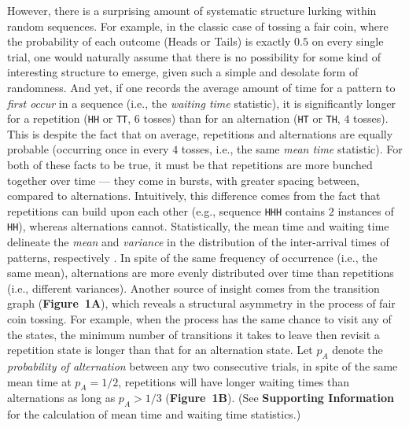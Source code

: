 \documentclass{pnastwo}
\begin{document}
\begin{article}
However, there is a surprising amount of systematic structure lurking within random sequences.
For example, in the classic case of tossing a fair coin, where the probability of each outcome (Heads or Tails) is exactly $0.5$ on every single trial, one would naturally assume that there is no possibility for some kind of interesting structure to emerge, given such a simple and desolate form of randomness.
And yet, if one records the average amount of time for a pattern to \emph{first occur} in a sequence (i.e., the \emph{waiting time} statistic), it is significantly longer for a repetition (\texttt{HH} or \texttt{TT}, $6$ tosses) than for an alternation (\texttt{HT} or \texttt{TH}, $4$ tosses).
This is despite the fact that on average, repetitions and alternations are equally probable (occurring once in every $4$ tosses, i.e., the same \emph{mean time} statistic).
For both of these facts to be true, it must be that repetitions are more bunched together over time --- they come in bursts, with greater spacing between, compared to alternations.
Intuitively, this difference comes from the fact that repetitions can build upon each other (e.g., sequence \texttt{HHH} contains $2$ instances of \texttt{HH}), whereas alternations cannot.
Statistically, the mean time and waiting time delineate the \emph{mean} and \emph{variance} in the distribution of the inter-arrival times of patterns, respectively \cite{Sun2010jdm}.
In spite of the same frequency of occurrence (i.e., the same mean), alternations are more evenly distributed over time than repetitions (i.e., different variances).
Another source of insight comes from the transition graph (\textbf{Figure~1A}), which reveals a structural asymmetry in the process of fair coin tossing.
For example, when the process has the same chance to visit any of the states, the minimum number of transitions it takes to leave then revisit a repetition state is longer than that for an alternation state.
Let $p_A$ denote the \emph{probability of alternation} between any two consecutive trials, in spite of the same mean time at $p_A = 1/2$,
repetitions will have longer waiting times than alternations as long as $p_A > 1/3$ (\textbf{Figure~1B}).
(See \textbf{Supporting Information} for the calculation of mean time and waiting time statistics.)



\end{article}
\end{document}
